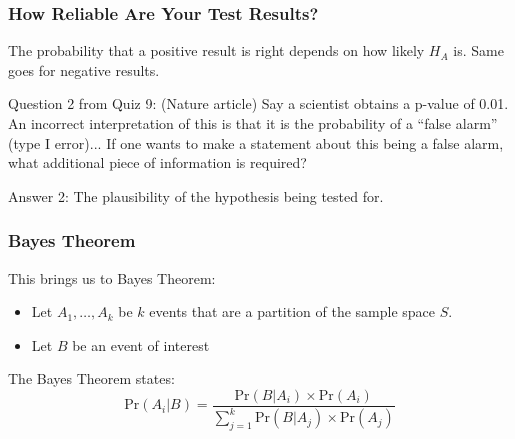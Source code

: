 \documentclass[handout]{beamer}
\newcommand{\blue}[1]{\textcolor{blue2}{#1}}
\newcommand{\prob}{\mbox{Pr}}
\begin{document}
\begin{frame}[fragile]
\frametitle{How Reliable Are Your Test Results?}

The probability that a positive result is right depends on how likely $H_A$ is.  Same goes for negative results.  

\vspace{0.5cm}

\pause\blue{Question 2 from Quiz 9}: (Nature article) Say a scientist obtains a p-value of 0.01.  An incorrect interpretation of this is that it is the probability of a ``false alarm'' (type I error)...  If one wants to make a statement about this being a false alarm, what additional piece of information is required?\\

\vspace{0.5cm}

\pause\blue{Answer 2}: The plausibility of the hypothesis being tested for.  


\end{frame}



\begin{frame}[fragile]
\frametitle{Bayes Theorem}

%
%
This brings us to Bayes Theorem: 
\pause\begin{itemize}
\item Let $A_1, \ldots, A_k$ be $k$ events that are a \blue{partition} of the sample space $S$.
\item Let $B$ be an event of interest
\end{itemize}
\pause
\vspace{0.5cm}

The Bayes Theorem states: 
\[
\prob(A_i|B) = \frac{\prob(B|A_i)\times\prob(A_i)}{\sum_{j=1}^{k}\prob(B|A_j)\times\prob(A_j)} 
\]

\end{frame}
\end{document}
